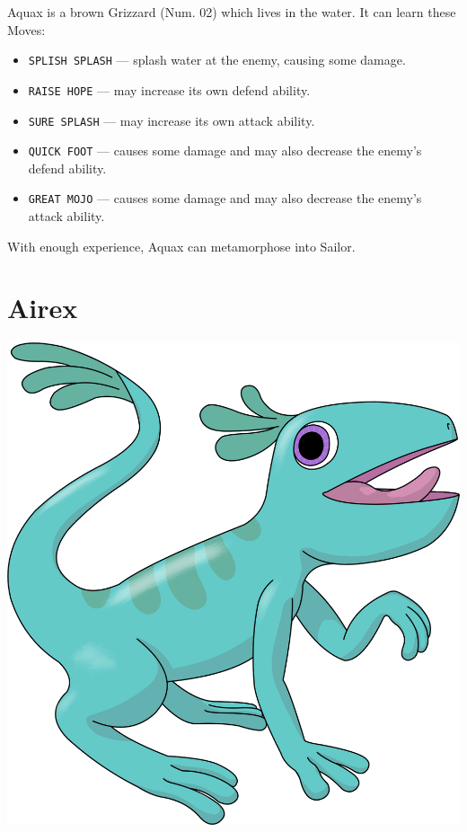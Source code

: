 \documentclass[10pt,twocolumn,openany,article]{memoir}
\begin{document}
Aquax is  a brown Grizzard  (Num. 02) which lives  in the water.  It can
learn these Moves:

\begin{itemize}
\item  \texttt{SPLISH SPLASH}  --- splash  water at  the enemy,  causing
  some damage. 
\item \texttt{RAISE HOPE} --- may increase its own defend ability.
\item \texttt{SURE SPLASH} --- may increase its own attack ability.
\item \texttt{QUICK FOOT}  --- causes some damage and  may also decrease
  the enemy's defend ability.
\item \texttt{GREAT MOJO}  --- causes some damage and  may also decrease
  the enemy's attack ability.
\end{itemize}

With enough experience, Aquax can metamorphose into Sailor.

\ifdefined\DEMO\else

\section{Airex}

\begin{center}
  \includegraphics[width=\columnwidth]{../Manual/Airex.png}
\end{center}
\end{document}

